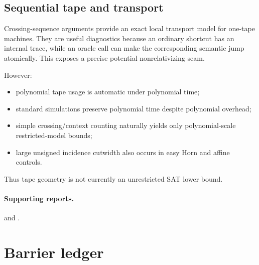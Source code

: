 \documentclass[11pt]{article}
\begin{document}
\subsection{Sequential tape and transport}

Crossing-sequence arguments provide an exact local transport model for one-tape machines. They are
useful diagnostics because an ordinary shortcut has an internal trace, while an oracle call can make
the corresponding semantic jump atomically. This exposes a precise potential nonrelativizing seam.

However:
\begin{itemize}
  \item polynomial tape usage is automatic under polynomial time;
  \item standard simulations preserve polynomial time despite polynomial overhead;
  \item simple crossing/context counting naturally yields only polynomial-scale restricted-model
        bounds;
  \item large unsigned incidence cutwidth also occurs in easy Horn and affine controls.
\end{itemize}
Thus tape geometry is not currently an unrestricted SAT lower bound.

\paragraph{Supporting reports.}
and
.

\section{Barrier ledger}
\end{document}
